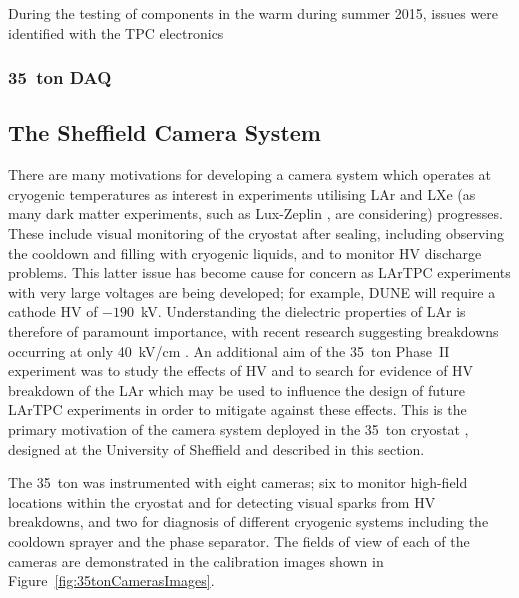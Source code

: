 During the testing of components in the warm during summer 2015, issues were identified with the TPC electronics

\subsubsection{35~ton DAQ}\label{sec:35tonDAQ}

\subsection{The Sheffield Camera System}\label{sec:SheffieldCameras}

There are many motivations for developing a camera system which operates at cryogenic temperatures as interest in experiments utilising LAr and LXe (as many dark matter experiments, such as Lux-Zeplin \cite{LZCDR2015}, are considering) progresses.  These include visual monitoring of the cryostat after sealing, including observing the cooldown and filling with cryogenic liquids, and to monitor HV discharge problems.  This latter issue has become cause for concern as LArTPC experiments with very large voltages are being developed; for example, DUNE will require a cathode HV of $-190$~kV.  Understanding the dielectric properties of LAr is therefore of paramount importance, with recent research suggesting breakdowns occurring at only 40~kV/cm \cite{Blatter2014}.  An additional aim of the 35~ton Phase~II experiment was to study the effects of HV and to search for evidence of HV breakdown of the LAr which may be used to influence the design of future LArTPC experiments in order to mitigate against these effects.  This is the primary motivation of the camera system deployed in the 35~ton cryostat \cite{35tonCameras2017}, designed at the University of Sheffield and described in this section.

The 35~ton was instrumented with eight cameras; six to monitor high-field locations within the cryostat and for detecting visual sparks from HV breakdowns, and two for diagnosis of different cryogenic systems including the cooldown sprayer and the phase separator.  The fields of view of each of the cameras are demonstrated in the calibration images shown in Figure~\ref{fig:35tonCamerasImages}.

